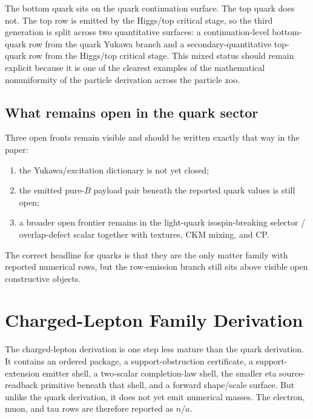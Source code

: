 \documentclass[11pt]{article}
\begin{document}
The bottom quark sits on the quark continuation surface. The top quark does not. The top
row is emitted by the Higgs/top critical stage, so the third generation is split across two quantitative
surfaces: a continuation-level bottom-quark row from the quark Yukawa branch and a
secondary-quantitative top-quark row from the Higgs/top critical stage. This mixed status
should remain explicit because it is one of the clearest examples of the mathematical
nonuniformity of the particle derivation across the particle zoo.

\subsection{What remains open in the quark sector}

Three open fronts remain visible and should be written exactly that way in the paper:
\begin{enumerate}[leftmargin=2em]
\item the Yukawa/excitation dictionary is not yet closed;
\item the emitted pure-\(B\) payload pair beneath the reported quark values is still open;
\item a broader open frontier remains in the light-quark isospin-breaking selector /
overlap-defect scalar together with textures, CKM mixing, and CP.
\end{enumerate}

The correct headline for quarks is that they are the only matter family with reported numerical
rows, but the row-emission branch still sits above visible open
constructive objects.

\section{Charged-Lepton Family Derivation}

The charged-lepton derivation is one step less mature than the quark derivation. It contains an
ordered package, a support-obstruction certificate, a support-extension emitter shell, a
two-scalar completion-law shell, the smaller eta source-readback primitive beneath that shell,
and a forward shape/scale surface. But unlike the quark derivation, it does not yet emit
numerical masses. The electron, muon, and tau rows are therefore reported as \(n/a\).
\end{document}
